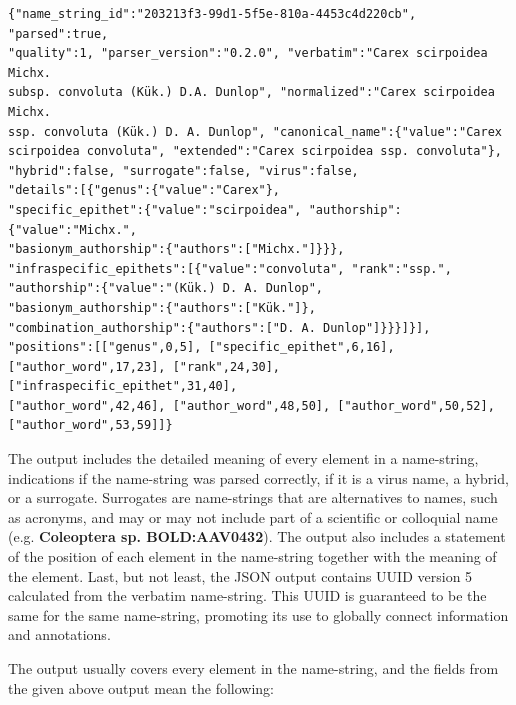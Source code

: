 \documentclass{bmcart}
\begin{document}
\begin{Verbatim}[fontsize=\small]
{"name_string_id":"203213f3-99d1-5f5e-810a-4453c4d220cb", "parsed":true,
"quality":1, "parser_version":"0.2.0", "verbatim":"Carex scirpoidea Michx.
subsp. convoluta (Kük.) D.A. Dunlop", "normalized":"Carex scirpoidea Michx.
ssp. convoluta (Kük.) D. A. Dunlop", "canonical_name":{"value":"Carex
scirpoidea convoluta", "extended":"Carex scirpoidea ssp. convoluta"},
"hybrid":false, "surrogate":false, "virus":false,
"details":[{"genus":{"value":"Carex"},
"specific_epithet":{"value":"scirpoidea", "authorship":{"value":"Michx.",
"basionym_authorship":{"authors":["Michx."]}}},
"infraspecific_epithets":[{"value":"convoluta", "rank":"ssp.",
"authorship":{"value":"(Kük.) D. A. Dunlop",
"basionym_authorship":{"authors":["Kük."]},
"combination_authorship":{"authors":["D. A. Dunlop"]}}}]}],
"positions":[["genus",0,5], ["specific_epithet",6,16],
["author_word",17,23], ["rank",24,30], ["infraspecific_epithet",31,40],
["author_word",42,46], ["author_word",48,50], ["author_word",50,52],
["author_word",53,59]]}
\end{Verbatim}

\vspace{0.5cm}

The output includes the detailed meaning of every element in a name-string,
indications if the name-string was parsed correctly, if it is a virus name, a
hybrid, or a surrogate. Surrogates are name-strings that are alternatives to
names, such as acronyms, and may or may not include part of a scientific or
colloquial name (e.g. \textbf{Coleoptera sp. BOLD:AAV0432}). The output also
includes a statement of the position of each element in the name-string
together with the meaning of the element.  Last, but not least, the JSON output
contains UUID version 5 calculated from the verbatim name-string. This UUID is
guaranteed to be the same for the same name-string, promoting its use to
globally connect information and annotations.

The output usually covers every element in the name-string, and the fields from
the given above output mean the following:
\end{document}
